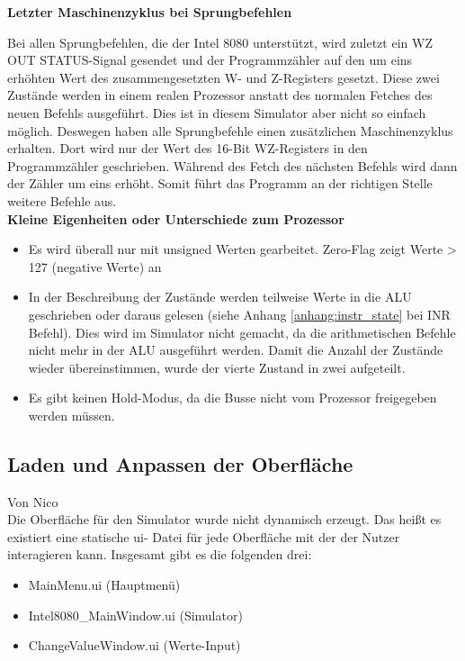 \documentclass[12pt]{article}
\newcommand{\imgSpaceBefore}{\vspace{10pt}}
\begin{document}
\noindent
\textbf{Letzter Maschinenzyklus bei Sprungbefehlen}

\noindent
Bei allen Sprungbefehlen, die der Intel 8080 unterstützt, wird zuletzt ein WZ OUT STATUS-Signal gesendet und der Programmzähler auf den um eins erhöhten Wert des zusammengesetzten W- und Z-Registers gesetzt. Diese zwei Zustände werden in einem realen Prozessor anstatt des normalen Fetches des neuen Befehls ausgeführt. Dies ist in diesem Simulator aber nicht so einfach möglich. Deswegen haben alle Sprungbefehle einen zusätzlichen Maschinenzyklus erhalten. Dort wird nur der Wert des 16-Bit WZ-Registers in den Programmzähler geschrieben. Während des Fetch des nächsten Befehls wird dann der Zähler um eins erhöht. Somit führt das Programm an der richtigen Stelle weitere Befehle aus.
\\

\noindent
\textbf{Kleine Eigenheiten oder Unterschiede zum Prozessor}

\noindent
\begin{itemize}
\item Es wird überall nur mit unsigned Werten gearbeitet. Zero-Flag zeigt Werte > 127 (negative Werte) an
\item In der Beschreibung der Zustände werden teilweise Werte in die ALU geschrieben oder daraus gelesen (siehe Anhang \ref{anhang:instr_state} bei INR Befehl). Dies wird im Simulator nicht gemacht, da die arithmetischen Befehle nicht mehr in der ALU ausgeführt werden. Damit die Anzahl der Zustände wieder übereinstimmen, wurde der vierte Zustand in zwei aufgeteilt.
\item Es gibt keinen Hold-Modus, da die Busse nicht vom Prozessor freigegeben werden müssen.
\end{itemize}

\subsection{Laden und Anpassen der Oberfläche}\label{chapter:LadenDObfl}
Von Nico\\

\noindent
Die Oberfläche für den Simulator wurde nicht dynamisch erzeugt. Das heißt es existiert eine statische \glqq ui\grqq- Datei für jede Oberfläche mit der der Nutzer interagieren kann. Insgesamt gibt es die folgenden drei:\imgSpaceBefore

\begin{itemize}
	\item MainMenu.ui (Hauptmenü)
	\item Intel8080\_MainWindow.ui (Simulator)
	\item ChangeValueWindow.ui (Werte-Input)
\end{itemize}
\end{document}
